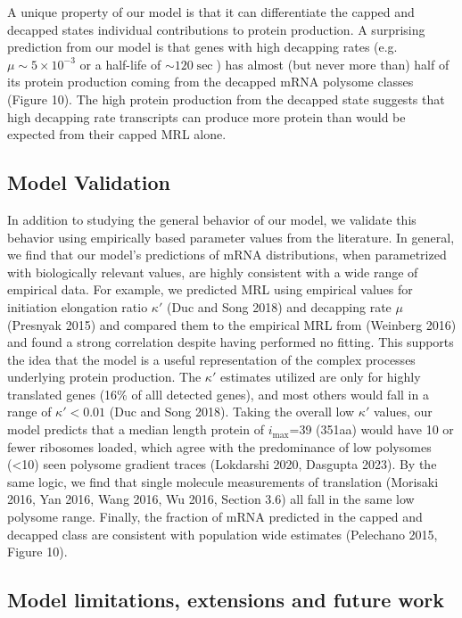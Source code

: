\documentclass[review]{elsarticle}
\newcommand{\imax}{\ensuremath{{i_{\max}}}\xspace}
\begin{document}
A unique property of our model is that it can differentiate the capped and decapped states individual contributions to protein production. 
A surprising prediction from our model is that genes with  high decapping rates (e.g. $\mu  \sim 5 \times 10^{-3}$ or a half-life of $\sim 120 \sec$) has almost (but never more than) half of its protein production coming from the decapped mRNA polysome classes (Figure 10).
The high protein production from the decapped state suggests that high decapping rate transcripts can produce more protein than would be expected from their capped MRL alone. 


\subsection{Model Validation}

In addition to studying the general behavior of our model, we validate this behavior using empirically based parameter values from the literature.
In general, we find that our model's predictions of mRNA distributions, when parametrized with biologically relevant values, are highly consistent with a wide range of empirical data.
For example, we predicted MRL using empirical values for initiation elongation ratio $\kappa'$ (Duc and Song 2018) and decapping rate $\mu$ (Presnyak 2015) and compared them to the empirical MRL from (Weinberg 2016) and found a strong correlation despite having performed no fitting. This supports the idea that the model is a useful representation of the complex processes underlying protein production.
The $\kappa'$ estimates utilized are only for highly translated genes (16\% of alll detected genes), and most others would fall in a range of $\kappa'<0.01$ (Duc and Song 2018).
Taking the overall low $\kappa'$ values, our model predicts that a median length protein of \imax =39 (351aa) would have 10 or fewer ribosomes loaded, which agree with the predominance of low polysomes (<10) seen polysome gradient traces (Lokdarshi 2020, Dasgupta 2023). 
By the same logic, we find that single molecule measurements of translation (Morisaki 2016, Yan 2016, Wang 2016, Wu 2016, Section 3.6) all fall in the same low polysome range.
Finally, the fraction of mRNA predicted in the capped and decapped class  are consistent with population wide estimates (Pelechano 2015, Figure 10). 


\subsection{Model limitations, extensions and future work}
\end{document}
